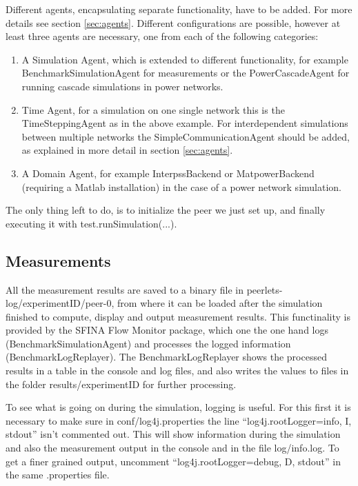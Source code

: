 \documentclass[11pt,fleqn]{book} %
\newcommand{\MainAgent}{Simulation Agent}
\newcommand{\TimeAgent}{Time Agent}
\newcommand{\TimeSteppingAgent}{TimeSteppingAgent}
\newcommand{\SimpleCommunicationAgent}{SimpleCommunicationAgent}
\newcommand{\DomainAgent}{Domain Agent} %
\newcommand{\InterpssDomainAgent}{InterpssBackend}
\newcommand{\MatpowerDomainAgent}{MatpowerBackend}
\newcommand{\BenchmarkAgent}{BenchmarkSimulationAgent}
\newcommand{\BenchmarkLogReplayer}{BenchmarkLogReplayer}
\newcommand{\CascadeAgent}{CascadeAgent}
\begin{document}
Different agents, encapsulating separate functionality, have to be added. For more details see section \ref{sec:agents}. Different configurations are possible, however at least three agents are necessary, one from each of the following categories:
\begin{enumerate}
	\item A \MainAgent{}, which is extended to different functionality, for example \BenchmarkAgent{} for measurements or the Power\CascadeAgent{} for running cascade simulations in power networks.
	\item \TimeAgent, for a simulation on one single network this is the \TimeSteppingAgent{} as in the above example. For interdependent simulations between multiple networks the \SimpleCommunicationAgent{} should be added, as explained in more detail in section \ref{sec:agents}.
	\item A \DomainAgent, for example \InterpssDomainAgent{} or \MatpowerDomainAgent{} (requiring a Matlab installation) in the case of a power network simulation.
\end{enumerate}

The only thing left to do, is to initialize the peer we just set up, and finally executing it with test.runSimulation(...).

\subsection{Measurements}
All the measurement results are saved to a binary file in peerlets-log/experimentID/peer-0, from where it can be loaded after the simulation finished to compute, display and output measurement results. This functinality is provided by the SFINA Flow Monitor package, which one the one hand logs (BenchmarkSimulationAgent) and processes the logged information (\BenchmarkLogReplayer{}). The \BenchmarkLogReplayer{} shows the processed results in a table in the console and log files, and also writes the values to files in the folder results/experimentID for further processing.

To see what is going on during the simulation, logging is useful. For this first it is necessary to make sure in conf/log4j.properties the line “log4j.rootLogger=info, I, stdout” isn’t commented out. This will show information during the simulation and also the measurement output in the console and in the file log/info.log. To get a finer grained output, uncomment “log4j.rootLogger=debug, D, stdout” in the same .properties file.
\end{document}
